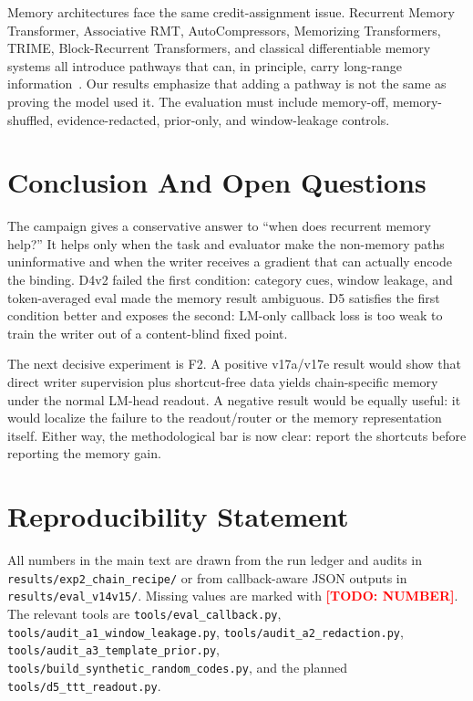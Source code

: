 \documentclass{article}
\newcommand{\todo}[1]{\textcolor{red}{\textbf{[TODO: #1]}}}
\begin{document}
Memory architectures face the same credit-assignment issue.  Recurrent
Memory Transformer, Associative RMT, AutoCompressors, Memorizing
Transformers, TRIME, Block-Recurrent Transformers, and classical
differentiable memory systems all introduce pathways that can, in
principle, carry long-range information~\cite{rmt2022,armt2024,
autocompressors2023,memorizing2022,trime2022,blockrecurrent2022,
ntm2014}.  Our results emphasize that adding a pathway is not the same
as proving the model used it.  The evaluation must include memory-off,
memory-shuffled, evidence-redacted, prior-only, and window-leakage
controls.

\section{Conclusion And Open Questions}

The campaign gives a conservative answer to ``when does recurrent memory
help?''  It helps only when the task and evaluator make the non-memory
paths uninformative and when the writer receives a gradient that can
actually encode the binding.  D4v2 failed the first condition: category
cues, window leakage, and token-averaged eval made the memory result
ambiguous.  D5 satisfies the first condition better and exposes the
second: LM-only callback loss is too weak to train the writer out of a
content-blind fixed point.

The next decisive experiment is F2.  A positive v17a/v17e result would
show that direct writer supervision plus shortcut-free data yields
chain-specific memory under the normal LM-head readout.  A negative
result would be equally useful: it would localize the failure to the
readout/router or the memory representation itself.  Either way, the
methodological bar is now clear: report the shortcuts before reporting
the memory gain.

\section*{Reproducibility Statement}

All numbers in the main text are drawn from the run ledger and audits in
\texttt{results/exp2\_chain\_recipe/} or from callback-aware JSON
outputs in \texttt{results/eval\_v14v15/}.  Missing values are marked
with \todo{NUMBER}.  The relevant tools are
\texttt{tools/eval\_callback.py}, \texttt{tools/audit\_a1\_window\_leakage.py},
\texttt{tools/audit\_a2\_redaction.py}, \texttt{tools/audit\_a3\_template\_prior.py},
\texttt{tools/build\_synthetic\_random\_codes.py}, and the planned
\texttt{tools/d5\_ttt\_readout.py}.
\end{document}
